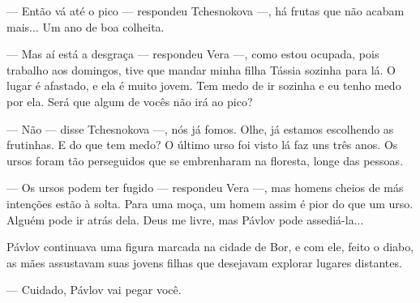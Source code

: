 --- Então vá até o pico --- respondeu Tchesnokova ---, há frutas que não
acabam mais... Um ano de boa colheita.

--- Mas aí está a desgraça --- respondeu Vera ---, como estou ocupada,
pois trabalho aos domingos, tive que mandar minha filha Tássia sozinha
para lá. O lugar é afastado, e ela é muito jovem. Tem medo de ir sozinha
e eu tenho medo por ela. Será que algum de vocês não irá ao pico?

--- Não --- disse Tchesnokova ---, nós já fomos. Olhe, já estamos
escolhendo as frutinhas. E do que tem medo? O último urso foi visto lá
faz uns três anos. Os ursos foram tão perseguidos que se embrenharam na
floresta, longe das pessoas.

--- Os ursos podem ter fugido --- respondeu Vera ---, mas homens cheios
de más intenções estão à solta. Para uma moça, um homem assim é pior do
que um urso. Alguém pode ir atrás dela. Deus me livre, mas Pávlov pode
assediá-la...

Pávlov continuava uma figura marcada na cidade de Bor, e com ele, feito
o diabo, as mães assustavam suas jovens filhas que desejavam explorar
lugares distantes.

--- Cuidado, Pávlov vai pegar você.

